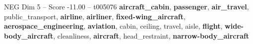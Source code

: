 \begin{textsample}{NEG Dim 5 – Score -11.00 – t005076}  \label{ex:f5_neg_036}
\textbf{aircraft\_cabin}, \textbf{passenger}, \textbf{air\_travel}, public\_transport, \textbf{airline}, \textbf{airliner}, \textbf{fixed-wing\_aircraft}, \textbf{aerospace\_engineering}, \textbf{aviation}, cabin, ceiling, travel, aisle, \textbf{flight}, \textbf{wide-body\_aircraft}, cleanliness, \textbf{aircraft}, head\_restraint, \textbf{narrow-body\_aircraft}

\end{textsample}
